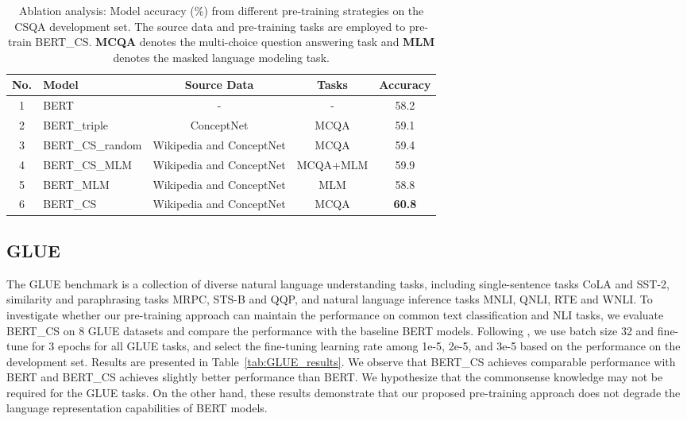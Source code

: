 \documentclass[11pt,a4paper]{article}
\begin{document}
\begin{table*}[t!]
\begin{center}
		\small
		\begin{tabular}{c|p{2.5cm}|c|c|c}
			\toprule
			\textbf{No.} &
            \textbf{Model}      & \textbf{Source Data}  & \textbf{Tasks}       & \textbf{Accuracy}  \\
            \midrule
            1 & BERT   & -  & -    & 58.2     \\
            \midrule
            2 & BERT\_triple & ConceptNet & MCQA    & 59.1     \\
            \midrule
            3 & BERT\_CS\_random  & Wikipedia and ConceptNet  &  MCQA     & 59.4 \\
            \midrule
            4 & BERT\_CS\_MLM    & Wikipedia and ConceptNet & MCQA+MLM              & 59.9  \\
            \midrule
            5 & BERT\_MLM    & Wikipedia and ConceptNet & MLM              & 58.8  \\
            \midrule
            6 & BERT\_CS & Wikipedia and ConceptNet & MCQA  & \textbf{60.8}  \\
			\bottomrule
		\end{tabular}
	\end{center}
	\caption{Ablation analysis: Model accuracy (\%) from different pre-training strategies on the CSQA development set. The source data and pre-training tasks are employed to pre-train BERT\_CS. \textbf{MCQA} denotes the multi-choice question answering task and \textbf{MLM} denotes the masked language modeling task.}
	\label{tab:analysis}
\end{table*}

\subsection{GLUE}
The GLUE benchmark \citep{wang-etal-2018-glue} is a collection of diverse natural language understanding tasks, including single-sentence tasks CoLA and SST-2, similarity and paraphrasing tasks MRPC, STS-B and QQP, and natural language inference tasks MNLI, QNLI, RTE and WNLI.
To investigate whether our pre-training approach can maintain the performance on common text classification and NLI tasks, we evaluate BERT\_CS on 8 GLUE datasets and compare the performance with the baseline BERT models.
Following \citet{devlin-etal-2019-bert}, we use batch size 32 and fine-tune for 3 epochs for all GLUE tasks, and select the fine-tuning learning rate among 1e-5, 2e-5, and 3e-5 based on the performance on the development set.
Results are presented in Table~\ref{tab:GLUE_results}. 
We observe that BERT\_CS achieves comparable performance with BERT and BERT\_CS achieves slightly better performance than BERT.  We hypothesize that the commonsense knowledge may not be required for the GLUE tasks. On the other hand, these results demonstrate that our proposed pre-training approach does not degrade the language representation capabilities of BERT models. 
\end{document}
